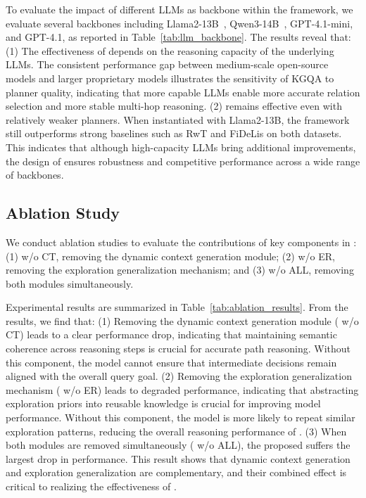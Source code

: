 To evaluate the impact of different LLMs as backbone within the \method{} framework, we evaluate several backbones including Llama2-13B~\citep{roque2025evolution}, Qwen3-14B~\citep{team2024qwen2}, GPT-4.1-mini, and GPT-4.1, as reported in Table~\ref{tab:llm_backbone}. The results reveal that: (1) The effectiveness of \method{} depends on the reasoning capacity of the underlying LLMs. The consistent performance gap between medium-scale open-source models and larger proprietary models illustrates the sensitivity of KGQA to planner quality, indicating that more capable LLMs enable more accurate relation selection and more stable multi-hop reasoning. (2) \method{} remains effective even with relatively weaker planners. When instantiated with Llama2-13B, the framework still outperforms strong baselines such as RwT and FiDeLis on both datasets. This indicates that although high-capacity LLMs bring additional improvements, the design of \method{} ensures robustness and competitive performance across a wide range of backbones.


\subsection{Ablation Study}

We conduct ablation studies to evaluate the contributions of key components in \method{}: (1) \method{} w/o CT, removing the dynamic context generation module; (2) \method{} w/o ER, removing the exploration generalization mechanism; and (3) \method{} w/o ALL, removing both modules simultaneously.

Experimental results are summarized in Table~\ref{tab:ablation_results}. From the results, we find that:
 (1) Removing the dynamic context generation module (\method{} w/o CT) leads to a clear performance drop, indicating that maintaining semantic coherence across reasoning steps is crucial for accurate path reasoning. Without this component, the model cannot ensure that intermediate decisions remain aligned with the overall query goal. (2) Removing the exploration generalization mechanism (\method{} w/o ER) leads to degraded performance, indicating that abstracting exploration priors into reusable knowledge is crucial for improving model performance. Without this component, the model is more likely to repeat similar exploration patterns, reducing the overall reasoning performance of \method{}. (3) When both modules are removed simultaneously (\method{} w/o ALL), the proposed \method{} suffers the largest drop in performance. This result shows that dynamic context generation and exploration generalization are complementary, and their combined effect is critical to realizing the effectiveness of \method{}.


